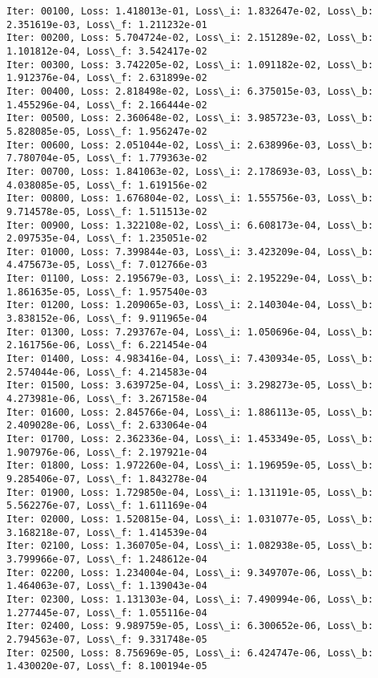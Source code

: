\documentclass[11pt]{article}
\begin{document}
    \begin{Verbatim}[commandchars=\\\{\}]
Iter: 00100, Loss: 1.418013e-01, Loss\_i: 1.832647e-02, Loss\_b: 2.351619e-03, Loss\_f: 1.211232e-01
Iter: 00200, Loss: 5.704724e-02, Loss\_i: 2.151289e-02, Loss\_b: 1.101812e-04, Loss\_f: 3.542417e-02
Iter: 00300, Loss: 3.742205e-02, Loss\_i: 1.091182e-02, Loss\_b: 1.912376e-04, Loss\_f: 2.631899e-02
Iter: 00400, Loss: 2.818498e-02, Loss\_i: 6.375015e-03, Loss\_b: 1.455296e-04, Loss\_f: 2.166444e-02
Iter: 00500, Loss: 2.360648e-02, Loss\_i: 3.985723e-03, Loss\_b: 5.828085e-05, Loss\_f: 1.956247e-02
Iter: 00600, Loss: 2.051044e-02, Loss\_i: 2.638996e-03, Loss\_b: 7.780704e-05, Loss\_f: 1.779363e-02
Iter: 00700, Loss: 1.841063e-02, Loss\_i: 2.178693e-03, Loss\_b: 4.038085e-05, Loss\_f: 1.619156e-02
Iter: 00800, Loss: 1.676804e-02, Loss\_i: 1.555756e-03, Loss\_b: 9.714578e-05, Loss\_f: 1.511513e-02
Iter: 00900, Loss: 1.322108e-02, Loss\_i: 6.608173e-04, Loss\_b: 2.097535e-04, Loss\_f: 1.235051e-02
Iter: 01000, Loss: 7.399844e-03, Loss\_i: 3.423209e-04, Loss\_b: 4.475673e-05, Loss\_f: 7.012766e-03
Iter: 01100, Loss: 2.195679e-03, Loss\_i: 2.195229e-04, Loss\_b: 1.861635e-05, Loss\_f: 1.957540e-03
Iter: 01200, Loss: 1.209065e-03, Loss\_i: 2.140304e-04, Loss\_b: 3.838152e-06, Loss\_f: 9.911965e-04
Iter: 01300, Loss: 7.293767e-04, Loss\_i: 1.050696e-04, Loss\_b: 2.161756e-06, Loss\_f: 6.221454e-04
Iter: 01400, Loss: 4.983416e-04, Loss\_i: 7.430934e-05, Loss\_b: 2.574044e-06, Loss\_f: 4.214583e-04
Iter: 01500, Loss: 3.639725e-04, Loss\_i: 3.298273e-05, Loss\_b: 4.273981e-06, Loss\_f: 3.267158e-04
Iter: 01600, Loss: 2.845766e-04, Loss\_i: 1.886113e-05, Loss\_b: 2.409028e-06, Loss\_f: 2.633064e-04
Iter: 01700, Loss: 2.362336e-04, Loss\_i: 1.453349e-05, Loss\_b: 1.907976e-06, Loss\_f: 2.197921e-04
Iter: 01800, Loss: 1.972260e-04, Loss\_i: 1.196959e-05, Loss\_b: 9.285406e-07, Loss\_f: 1.843278e-04
Iter: 01900, Loss: 1.729850e-04, Loss\_i: 1.131191e-05, Loss\_b: 5.562276e-07, Loss\_f: 1.611169e-04
Iter: 02000, Loss: 1.520815e-04, Loss\_i: 1.031077e-05, Loss\_b: 3.168218e-07, Loss\_f: 1.414539e-04
Iter: 02100, Loss: 1.360705e-04, Loss\_i: 1.082938e-05, Loss\_b: 3.799966e-07, Loss\_f: 1.248612e-04
Iter: 02200, Loss: 1.234004e-04, Loss\_i: 9.349707e-06, Loss\_b: 1.464063e-07, Loss\_f: 1.139043e-04
Iter: 02300, Loss: 1.131303e-04, Loss\_i: 7.490994e-06, Loss\_b: 1.277445e-07, Loss\_f: 1.055116e-04
Iter: 02400, Loss: 9.989759e-05, Loss\_i: 6.300652e-06, Loss\_b: 2.794563e-07, Loss\_f: 9.331748e-05
Iter: 02500, Loss: 8.756969e-05, Loss\_i: 6.424747e-06, Loss\_b: 1.430020e-07, Loss\_f: 8.100194e-05

\end{Verbatim}
\end{document}
